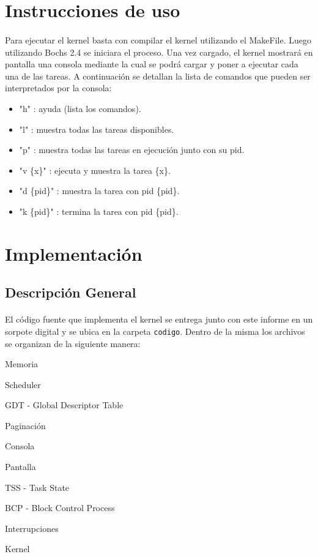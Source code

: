 \documentclass[11pt, a4paper]{article}
\begin{document}
\section{Instrucciones de uso}
	\paragraph{}
	Para ejecutar el kernel basta con compilar el kernel utilizando el MakeFile. Luego utilizando Bochs 2.4 se iniciara el proceso. Una vez cargado, el kernel mostrará en pantalla una consola mediante la cual se podrá cargar y poner a ejecutar cada una de las tareas. A continuación se detallan la lista de comandos que pueden ser interpretados por la consola:
	\begin{itemize}
		\item "h" : ayuda (lista los comandos).
		\item "l" : muestra todas las tareas disponibles.
		\item "p" : muestra todas las tareas en ejecuci\'on junto con su pid.
		\item "v \{x\}" : ejecuta y muestra la tarea \{x\}.
		\item "d \{pid\}" : muestra la tarea con pid \{pid\}.
		\item "k \{pid\}" : termina la tarea con pid \{pid\}.
	\end{itemize}


\section{Implementación}
\subsection{Descripción General}
	\paragraph{}
	El código fuente que implementa el kernel se entrega junto con este informe en un sorpote digital y se ubica en la carpeta \texttt{codigo}. Dentro de la misma los archivos se organizan de la siguiente manera:
	\begin{center}
		\begin{shortitemize}
		\setlength{\shortitemwidth}{200pt}
		\item Memoria
		\item Scheduler
		\item GDT - Global Descriptor Table
		\item Paginación				
		\item Consola
		\item Pantalla
		\item TSS - Task State
		\item BCP - Block Control Process
		\item Interrupciones							
		\item Kernel
		\end{shortitemize}
	\end{center}		
\end{document}
